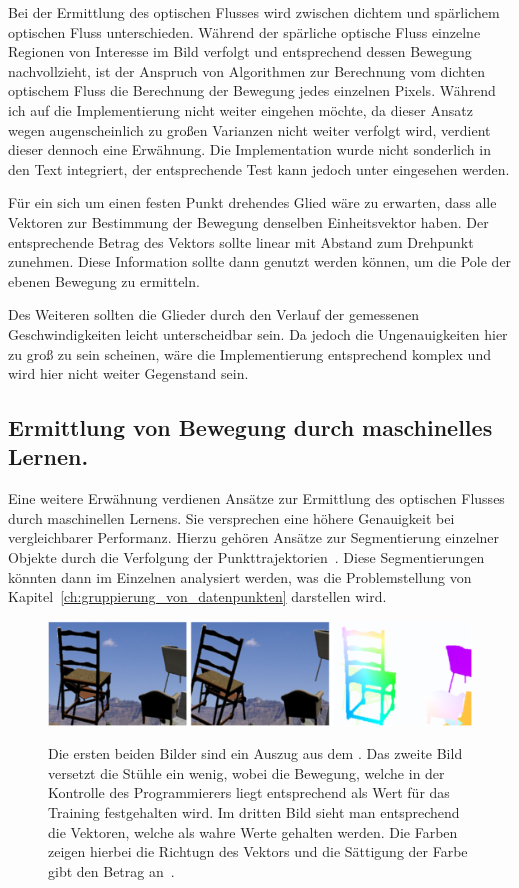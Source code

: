 Bei der Ermittlung des optischen Flusses wird zwischen dichtem und spärlichem optischen Fluss unterschieden.
Während der spärliche optische Fluss einzelne Regionen von Interesse im Bild verfolgt und entsprechend dessen Bewegung nachvollzieht, ist der Anspruch von Algorithmen zur Berechnung vom dichten optischem Fluss die Berechnung der Bewegung jedes einzelnen Pixels.
Während ich auf die Implementierung nicht weiter eingehen möchte, da dieser Ansatz wegen augenscheinlich zu gro{\ss}en Varianzen nicht weiter verfolgt wird, verdient dieser dennoch eine Erwähnung.
Die Implementation wurde nicht sonderlich in den Text integriert, der entsprechende Test kann jedoch unter  eingesehen werden.

Für ein sich um einen festen Punkt drehendes Glied wäre zu erwarten, dass alle Vektoren zur Bestimmung der Bewegung denselben Einheitsvektor haben.
Der entsprechende Betrag des Vektors sollte linear mit Abstand zum Drehpunkt zunehmen.
Diese Information sollte dann genutzt werden können, um die Pole der ebenen Bewegung zu ermitteln.

Des Weiteren sollten die Glieder durch den Verlauf der gemessenen Geschwindigkeiten leicht unterscheidbar sein.
Da jedoch die Ungenauigkeiten hier zu gro{\ss} zu sein scheinen, wäre die Implementierung entsprechend komplex und wird hier nicht weiter Gegenstand sein.

\subsection{Ermittlung von Bewegung durch maschinelles Lernen.}

Eine weitere Erwähnung verdienen Ansätze zur Ermittlung des optischen Flusses durch maschinellen Lernens.
Sie versprechen eine höhere Genauigkeit bei vergleichbarer Performanz.
Hierzu gehören Ansätze zur Segmentierung einzelner Objekte durch die Verfolgung der Punkttrajektorien~\cite{Ochs2014, Keuper2015}.
Diese Segmentierungen könnten dann im Einzelnen analysiert werden, was die Problemstellung von Kapitel~\ref{ch:gruppierung_von_datenpunkten} darstellen wird.

\begin{figure}
    \centering
    \includegraphics[width=\textwidth]{gfx/flownet_flying_chairs.png}
    \label{fig:flownet_flying_chairs}
    \caption[Beispiele aus dem ]{Die ersten beiden Bilder sind ein Auszug aus dem . Das zweite Bild versetzt die Stühle ein wenig, wobei die Bewegung, welche in der Kontrolle des Programmierers liegt entsprechend als Wert für das Training festgehalten wird. Im dritten Bild sieht man entsprechend die Vektoren, welche als wahre Werte gehalten werden. Die Farben zeigen hierbei die Richtugn des Vektors und die Sättigung der Farbe gibt den Betrag an~\cite{Fischer2015}.}
\end{figure}

